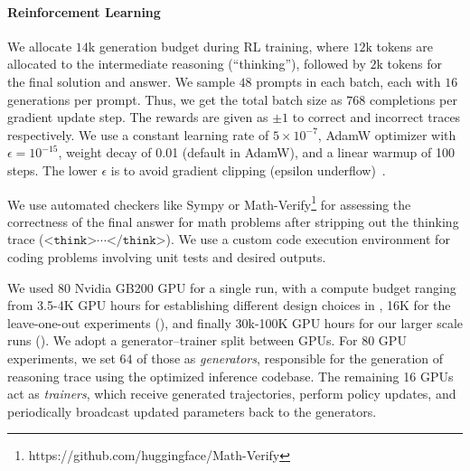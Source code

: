 \paragraph{Reinforcement Learning}
We allocate $14$k generation budget during RL training, where $12\text{k}$ tokens are allocated to the intermediate reasoning (``thinking''), followed by $2\text{k}$ tokens for the final solution and answer. We sample $48$ prompts in each batch, each with $16$ generations per prompt. Thus, we get the total batch size as $768$ completions per gradient update step. The rewards are given as $\pm 1$ to correct and incorrect traces respectively. We use a constant learning rate of $5 \times 10^{-7}$, AdamW optimizer \citep{adamw} with $\epsilon = 10^{-15}$, weight decay of 0.01 (default in AdamW), and a linear warmup of 100 steps. The lower $\epsilon$ is to avoid gradient clipping (epsilon underflow)~\citep{wortsman2023stable}.

We use automated checkers like Sympy \citep{meurer2017sympy} or Math-Verify\footnote{https://github.com/huggingface/Math-Verify} for assessing the correctness of the final answer for math problems after stripping out the thinking trace ($\texttt{<think>}\cdots\texttt{</think>}$). We use a custom code execution environment for coding problems involving unit tests and desired outputs.

We used 80 Nvidia GB200 GPU for a single run, with a compute budget ranging from 3.5-4K GPU hours for establishing different design choices in , 16K for the leave-one-out experiments (), and finally 30k-100K GPU hours for our larger scale runs (). We adopt a generator–trainer split between GPUs. For 80 GPU experiments, we set $64$ of those as \emph{generators}, responsible for the generation of reasoning trace using the optimized inference codebase. The remaining 16 GPUs act as \emph{trainers}, which receive generated trajectories, perform policy updates, and periodically broadcast updated parameters back to the generators.

